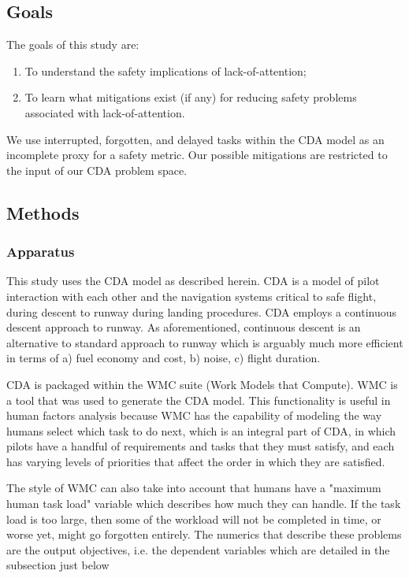 \documentclass[journal]{IEEEtran}
\newcommand{\be}{\begin{enumerate}}
\newcommand{\ee}{\end{enumerate}}
\newcommand{\ADD}[1]{#1}
\begin{document}
\subsection{Goals}

The goals of this study are:
\be
\item
To understand the safety implications of lack-of-attention;
\item
To learn what mitigations exist (if any) for reducing safety problems associated with lack-of-attention.
\ee
\ADD{We use interrupted, forgotten, and delayed tasks within the CDA model as an incomplete proxy for a safety metric.
Our possible mitigations are restricted to the input of our CDA problem space.}




\subsection{Methods}
\subsubsection{Apparatus}

This study uses the CDA model as described herein.  CDA is a model of pilot interaction with each other and the navigation systems critical to safe flight, during descent to runway during landing procedures.  CDA employs a continuous descent approach to runway.  As aforementioned, continuous descent is an alternative to standard approach to runway which is arguably much more efficient in terms of a) fuel economy and cost, b) noise, c) flight duration.

CDA is packaged within the WMC suite (Work Models that Compute).  WMC is a tool that was used to generate the CDA model.  This functionality is useful in human factors analysis because WMC has the capability of modeling the way humans select which task to do next, which is an integral part of CDA, in which pilots have a handful of requirements and tasks that they must satisfy, and each has varying levels of priorities that affect the order in which they are satisfied.

The style of WMC can also take into account that humans have a "maximum human task load" variable which describes how much they can handle.  If the task load is too large, then some of the workload will not be completed in time, or worse yet, might go forgotten entirely.  The numerics that describe these problems are the output objectives, i.e. the dependent variables which are detailed in the subsection just below
\end{document}
